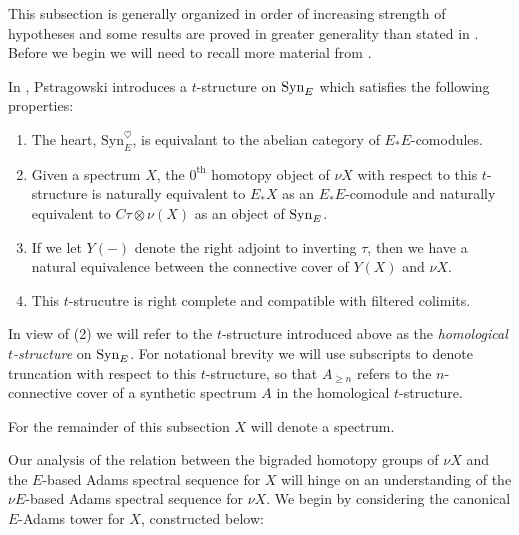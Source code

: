 This subsection is generally organized in order of increasing strength of hypotheses and some results are proved in greater generality than stated in . Before we begin we will need to recall more material from \cite{Pstragowski}.

\begin{rec}
  In \cite[Section 4.2, Lemma 4.29 and Proposition 4.35]{Pstragowski},
  Pstragowski introduces a $t$-structure on $\mathrm{Syn}_E$ which satisfies the following properties:
  \begin{enumerate}
  \item The heart, $\mathrm{Syn}_E ^{\heartsuit}$, is equivalant to the abelian category of $E_* E$-comodules.
  \item Given a spectrum $X$, the $0^{\mathrm{th}}$ homotopy object of $\nu X$ with respect to this $t$-structure is naturally equivalent to $E_*X$ as an $E_*E$-comodule and naturally equivalent to $C\tau \otimes \nu(X)$ as an object of $\mathrm{Syn}_E$.
  \item If we let $Y(-)$ denote the right adjoint to inverting $\tau$,
    then we have a natural equivalence between the connective cover of $Y(X)$ and $\nu X$.  
  \item This $t$-strucutre is right complete and compatible with filtered colimits.
  \end{enumerate}
\end{rec}

\begin{ntn}
  In view of (2) we will refer to the $t$-structure introduced above as the \emph{homological $t$-structure} on $\mathrm{Syn}_E$.
  For notational brevity we will use subscripts to denote truncation with respect to this $t$-structure, so that $A_{\geq n}$ refers to the $n$-connective cover of a synthetic spectrum $A$ in the homological $t$-structure.  
\end{ntn}

\begin{cnv}
For the remainder of this subsection $X$ will denote a spectrum.
\end{cnv}
Our analysis of the relation between the bigraded homotopy groups of $\nu X$ and the $E$-based Adams spectral sequence for $X$ will hinge on an understanding of the $\nu E$-based Adams spectral sequence for $\nu X$. We begin by considering the canonical $E$-Adams tower for $X$, constructed below:

